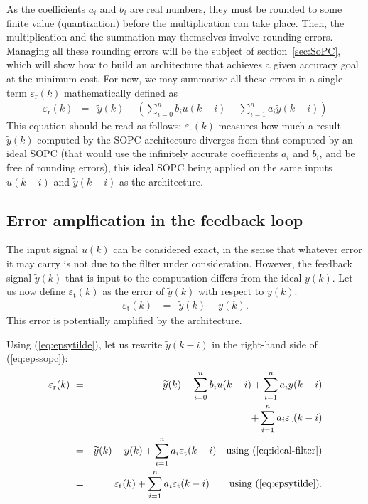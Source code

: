 \documentclass[twocolumn]{IEEEtran}
\newcommand{\abserr}{\varepsilon}
\newcommand{\appr}[1]{\widetilde{#1}}
\newcommand{\epssopc}{\abserr_{\text{r}}}
\newcommand{\epsytilde}{\abserr_{\text{t}}}
\begin{document}
As the coefficients $a_i$ and $b_i$ are real numbers, they must be rounded to some finite value (quantization)  before the multiplication can take place. 
Then, the multiplication and the summation may themselves involve rounding errors.
Managing all these rounding errors will be the subject of section~\ref{sec:SoPC}, which will show how to build an architecture that achieves a given accuracy goal at the minimum cost. 
For now, we may summarize all these errors in a single term $\epssopc(k)$ mathematically defined as
\begin{eqnarray}
  \epssopc(k) &= & \appr{y}(k) -  \left(\sum_{i=0}^n b_iu(k-i) -\sum_{i=1}^n a_i\appr{y}(k-i)\right)
 \label{eq:epssopc}
\end{eqnarray}
This equation should be read as follows: $\epssopc(k)$ measures how much a result $\appr{y}(k)$ computed by the SOPC architecture diverges  from that computed by an ideal SOPC (that would use the infinitely accurate coefficients $a_i$ and $b_i$,  and be free of rounding  errors), this ideal SOPC being applied on the same inputs $u(k-i)$  and $\appr{y}(k-i)$ as the architecture.


\subsection{Error amplfication in the feedback loop}
 The input signal $u(k)$ can be considered exact, in the sense that whatever error it may carry is not due to the filter under consideration. 
However, the feedback signal $\appr{y}(k)$ that is input to the computation differs from the ideal $y(k)$. Let us now define $\epsytilde(k)$ as the error of $\appr{y}(k)$ with respect to $y(k)$:
\begin{eqnarray}
  \epsytilde(k)\ &= & \appr{y}(k) - y(k) .
 \label{eq:epsytilde}
\end{eqnarray}
This error is potentially amplified by the architecture.






Using  (\ref{eq:epsytilde}), let us  rewrite $\appr{y}(k-i)$ in  the right-hand side of (\ref{eq:epssopc}): 
\begin{eqnarray}
  \epssopc(k)\ &= & \appr{y}(k) - \sum_{i=0}^n b_iu(k-i) +\sum_{i=1}^n a_i y(k-i) \nonumber \\
&&\quad + \sum_{i=1}^n a_i\epsytilde(k-i)  \label{eq:ltierr2} \nonumber\\
  &=& \appr{y}(k) -  y(k)  + \sum_{i=1}^n a_i \epsytilde(k-i) \quad \text{using (\ref{eq:ideal-filter})} \nonumber\\
  &=&\epsytilde(k) + \sum_{i=1}^n a_i \epsytilde(k-i) \quad \quad \text{using (\ref{eq:epsytilde})}.
  \label{eq:ltierr3}
\end{eqnarray}
\end{document}
